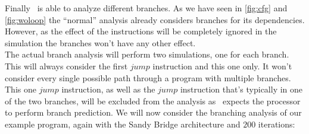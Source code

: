 Finally \suaca\ is able to analyze different branches. As we have seen in \autoref{fig:cfg} and \autoref{fig:woloop} the ``normal'' analysis already considers branches for its dependencies. However, as the effect of the instructions will be completely ignored in the simulation the branches won't have any other effect.\\
The actual branch analysis will perform two simulations, one for each branch. This will always consider the first $jump$ instruction and this one only. It won't consider every single possible path through a program with multiple branches. This one $jump$ instruction, as well as the $jump$ instruction that's typically in one of the two branches, will be excluded from the analysis as \suaca\ expects the processor to perform branch prediction. We will now consider the branching analysis of our example program, again with the Sandy Bridge architecture and $200$ iterations:

